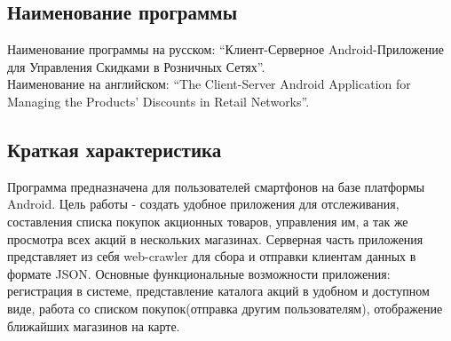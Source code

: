 \subsection{Наименование программы}
Наименование программы на русском: 
``Клиент-Серверное Android-Приложение для Управления Скидками в Розничных Сетях''. \\
Наименование на английском: 
``The Client-Server Android Application for Managing the Products' Discounts in Retail Networks''. \\


\subsection{Краткая характеристика} 
Программа предназначена для пользователей
смартфонов на базе платформы Android.  Цель работы - создать удобное приложения
для отслеживания, составления списка покупок акционных товаров, управления им,
а так же просмотра всех акций в нескольких магазинах. Серверная часть
приложения представляет из себя web-crawler для сбора и отправки клиентам
данных в формате JSON.  Основные функциональные возможности приложения:
регистрация в системе, представление каталога акций в удобном и доступном виде,
работа со списком покупок(отправка другим пользователям), отображение ближайших
магазинов на карте.

